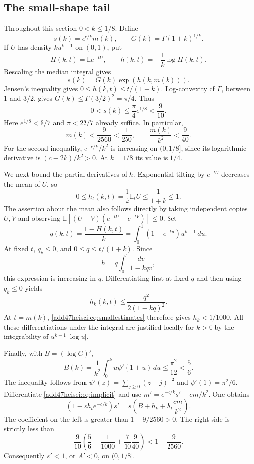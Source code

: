 \documentclass[11pt,a4paper]{article}
\numberwithin{equation}{section}
\theoremstyle{definition}
\theoremstyle{remark}
\begin{document}
\subsection{The small-shape tail}
Throughout this section $0<k\le1/8$. Define
\[
 s(k)=e^{c/k}m(k),\qquad
 G(k)=\Gamma(1+k)^{1/k}.
\]
If $U$ has density $ku^{k-1}$ on $(0,1)$, put
\[
 H(k,t)=\mathbb E e^{-tU},\qquad
 h(k,t)=-\frac1k\log H(k,t).
\]
Rescaling the median integral gives
\begin{equation}\label{add47heisei:eq:implicit}
 s(k)=G(k)\exp(h(k,m(k))).
\end{equation}
Jensen's inequality gives
$0\le h(k,t)\le t/(1+k)$.
Log-convexity of $\Gamma$, between $1$ and $3/2$, gives
$G(k)\le\Gamma(3/2)^2=\pi/4$. Thus
\[
 0<s(k)\le\frac\pi4e^{1/8}<\frac9{10}.
\]
Here $e^{1/8}<8/7$ and $\pi<22/7$ already suffice.
In particular,
\begin{equation}\label{add47heisei:eq:smallestimates}
 m(k)<\frac{9}{2560}<\frac1{250},\qquad
 \frac{m(k)}{k^2}<\frac9{40}.
\end{equation}
For the second inequality, $e^{-c/k}/k^2$ is increasing on $(0,1/8]$,
since its logarithmic derivative is $(c-2k)/k^2>0$.
At $k=1/8$ its value is $1/4$.

We next bound the partial derivatives of $h$. Exponential tilting by
$e^{-tU}$ decreases the mean of $U$, so
\begin{equation}\label{add47heisei:eq:ht}
 0\le h_t(k,t)=\frac1k\mathbb E_t U
 \le\frac1{1+k}\le1.
\end{equation}
The assertion about the mean also follows directly by taking independent
copies $U,V$ and observing
$\mathbb E[(U-V)(e^{-tU}-e^{-tV})]\le0$.
Set
\[
 q(k,t)=\frac{1-H(k,t)}{k}
       =\int_0^1(1-e^{-tu})u^{k-1}\,du.
\]
At fixed $t$, $q_k\le0$, and $0\le q\le t/(1+k)$. Since
\[
 h=q\int_0^1\frac{dv}{1-kqv},
\]
this expression is increasing in $q$. Differentiating first at fixed $q$
and then using $q_k\le0$ yields
\[
 h_k(k,t)\le\frac{q^2}{2(1-kq)^2}.
\]
At $t=m(k)$, \eqref{add47heisei:eq:smallestimates} therefore gives $h_k<1/1000$.
All these differentiations under the integral are justified locally for
$k>0$ by the integrability of $u^{k-1}|\log u|$.

Finally, with $B=(\log G)'$,
\[
 B(k)=\frac1{k^2}\int_0^k u\psi'(1+u)\,du
 \le\frac{\pi^2}{12}<\frac56.
\]
The inequality follows from
$\psi'(z)=\sum_{j\ge0}(z+j)^{-2}$ and $\psi'(1)=\pi^2/6$.
Differentiate \eqref{add47heisei:eq:implicit} and use
$m'=e^{-c/k}s'+cm/k^2$. One obtains
\[
 (1-s h_t e^{-c/k})s'
 =s\left(B+h_k+h_t\frac{cm}{k^2}\right).
\]
The coefficient on the left is greater than $1-9/2560>0$. The right side
is strictly less than
\[
 \frac9{10}\left(\frac56+\frac1{1000}
                         +\frac7{10}\frac9{40}\right)
 <1-\frac9{2560}.
\]
Consequently $s'<1$, or $A'<0$, on $(0,1/8]$.
\end{document}
